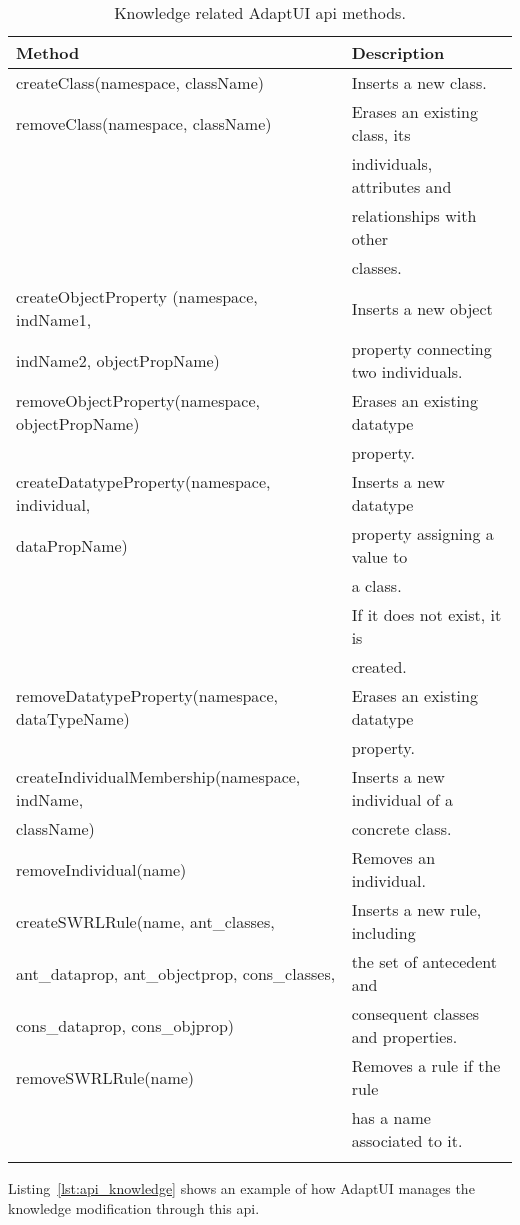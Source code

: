 \begin{center}
\footnotesize
\begin{longtable}{l l}

  \label{tbl:api_knowledge} \\
  \hline
  \textbf{Method}		& \textbf{Description}				\\
  \hline
  createClass(namespace, className)	& Inserts a new class.			\\
  removeClass(namespace, className)	& Erases an existing class, its		\\
					& individuals, attributes and		\\
					& relationships with other 		\\
					& classes.				\\
  \hline
  createObjectProperty	(namespace, indName1,& Inserts a new object		\\
  indName2, objectPropName)	& property connecting two individuals.		\\
  removeObjectProperty(namespace, objectPropName)& Erases an existing datatype	\\
 					& property.				\\
  \hline
  createDatatypeProperty(namespace, individual,& Inserts a new datatype		\\
  dataPropName)				& property assigning a value to 	\\
 					& a class.				\\
					& If it does not exist, it is		\\
					& created.				\\
  removeDatatypeProperty(namespace, dataTypeName)& Erases an existing datatype	\\
 					& property.				\\
  \hline
  createIndividualMembership(namespace, indName,& Inserts a new individual of a \\
  className)				& concrete class.			\\
  removeIndividual(name)	 	& Removes an individual.		\\
  \hline
  createSWRLRule(name, ant\_classes, 	& Inserts a new rule, including		\\
  ant\_dataprop, ant\_objectprop, cons\_classes,& the set of antecedent and	\\
  cons\_dataprop, cons\_objprop)	& consequent classes and properties.	\\
  removeSWRLRule(name)	 		& Removes a rule if the rule 		\\
					& has a name associated to it.		\\
  \hline
    \caption{Knowledge related AdaptUI \ac{api} methods.}				\\
\end{longtable}
\end{center}

Listing~\ref{lst:api_knowledge} shows an example of how AdaptUI manages the
knowledge modification through this \ac{api}. 


\inputminted[linenos=true, fontsize=\footnotesize, frame=lines]{java}{4_system_architecture/api_knowledge.java}
